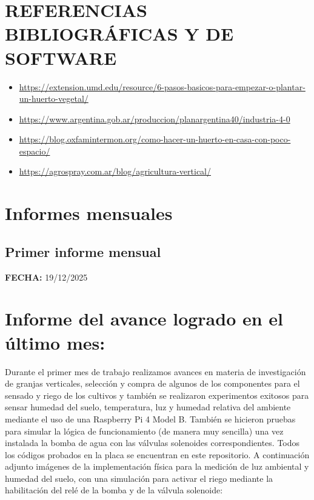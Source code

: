 \section*{REFERENCIAS BIBLIOGRÁFICAS Y DE SOFTWARE}
\begin{itemize}
    \item \url{https://extension.umd.edu/resource/6-pasos-basicos-para-empezar-o-plantar-un-huerto-vegetal/}
    \item \url{https://www.argentina.gob.ar/produccion/planargentina40/industria-4-0}
    \item \url{https://blog.oxfamintermon.org/como-hacer-un-huerto-en-casa-con-poco-espacio/}
    \item \url{https://agrospray.com.ar/blog/agricultura-vertical/}
\end{itemize}

\newpage
\section*{Informes mensuales}

\subsection*{Primer informe mensual}
\textbf{FECHA:} 19/12/2025

\section*{Informe del avance logrado en el último mes:}
Durante el primer mes de trabajo realizamos avances en materia de investigación de granjas verticales, selección y compra de algunos de los componentes para el sensado y riego de los cultivos y también se realizaron experimentos exitosos para sensar humedad del suelo, temperatura, luz y humedad relativa del ambiente mediante el uso de una Raspberry Pi 4 Model B. También se hicieron pruebas para simular la lógica de funcionamiento (de manera muy sencilla) una vez instalada la bomba de agua con las válvulas solenoides correspondientes. Todos los códigos probados en la placa se encuentran en este repositorio. A continuación adjunto imágenes de la implementación física para la medición de luz ambiental y humedad del suelo, con una simulación para activar el riego mediante la habilitación del relé de la bomba y de la válvula solenoide:

